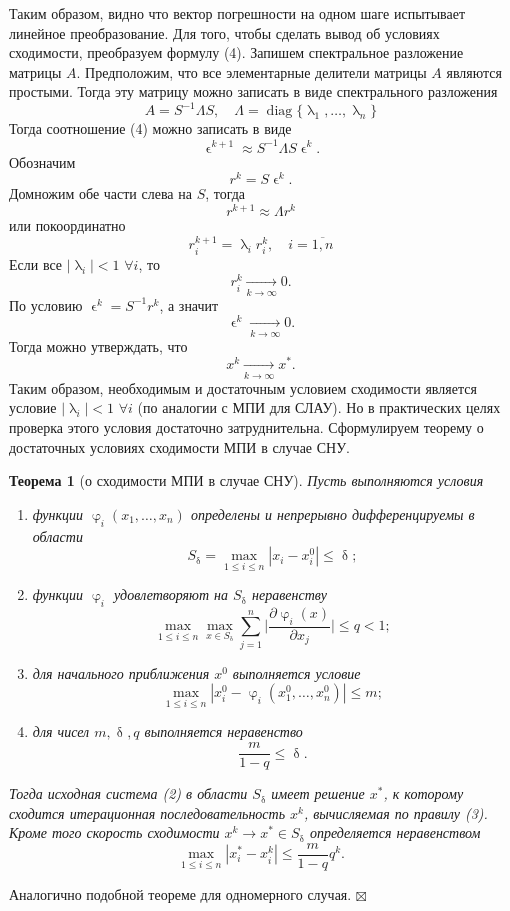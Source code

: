 \documentclass[a4paper, 12pt]{report}
\newenvironment{Proof} %
{\par\noindent{$\blacklozenge$}} %
{\hfill$\scriptstyle\boxtimes$}
\renewcommand{\leq}{\leqslant}
\renewcommand{\delta}{\updelta}
\renewcommand{\varphi}{\upvarphi}
\renewcommand{\lambda}{\uplambda}
\renewcommand{\epsilon}{\upvarepsilon}
\newtheorem*{theorem}{Теорема}
\begin{document}
Таким образом, видно что вектор погрешности на одном шаге испытывает линейное преобразование. Для того, чтобы сделать вывод об условиях сходимости, преобразуем формулу (4). Запишем спектральное разложение матрицы $A$. Предположим, что все элементарные делители матрицы $A$ являются простыми. Тогда эту матрицу можно записать в виде спектрального разложения $$A = S^{-1}\Lambda S,\quad \Lambda = \operatorname{diag}\{\lambda_1,\ldots, \lambda_n\}$$
Тогда соотношение (4) можно записать в виде $$\epsilon^{k+1} \approx S^{-1}\Lambda S \epsilon^k.$$
Обозначим $$r^k = S \epsilon^k.$$
Домножим обе части слева на $S$, тогда $$r^{k+1}\approx \Lambda r^k$$
или покоординатно $$r_i^{k+1} = \lambda_i r^k_i,\quad i=\overline{1,n}$$
Если все $|\lambda_i| <1$ $\forall i$, то $$r_i^k\xrightarrow[k\to \infty]{}0.$$ По условию $\epsilon^k = S^{-1}r^{k}$, а значит $$\epsilon^k\xrightarrow[k\to \infty]{}0.$$
Тогда можно утверждать, что $$x^k\xrightarrow[k\to\infty]{} x^*.$$
Таким образом, необходимым и достаточным условием сходимости является условие $|\lambda_i| <1$ $\forall i$ (по аналогии с МПИ для СЛАУ). Но в практических целях проверка этого условия достаточно затруднительна. Сформулируем теорему о достаточных условиях сходимости МПИ в случае СНУ.
\begin{theorem}
	[о сходимости МПИ в случае СНУ]
	Пусть выполняются условия\begin{enumerate}
		\item функции $\varphi_i(x_1,\ldots, x_n)$ определены и непрерывно дифференцируемы в области $$S_\delta = \max_{1\leq i \leq n}|x_i - x^0_i|\leq \delta;$$
		\item функции $\varphi_i$ удовлетворяют на $S_\delta$ неравенству
		$$\max_{1\leq i \leq n} \max_{x \in S_\delta} \sum_{j=1}^{n}\Big|\dfrac{\partial \varphi_i(x)}{\partial x_j}\Big|\leq q < 1;$$
		\item для начального приближения $x^0$ выполняется условие $$\max_{1\leq i \leq n}|x_i^0 - \varphi_i(x_1^0,\ldots, x_n^0)| \leq m;$$
		\item для чисел $m,\delta, q$ выполняется неравенство $$\dfrac{m}{1-q}\leq \delta.$$
	\end{enumerate}
	Тогда исходная система (2) в области $S_\delta$ имеет решение $x^*$, к которому сходится итерационная последовательность $x^k$, вычисляемая по правилу (3). Кроме того скорость сходимости $x^k \to x^* \in S_\delta$ определяется неравенством $$\max_{1\leq i \leq n}|x_i^* -x_i^k|\leq \dfrac{m}{1-q}q^k.$$
\end{theorem}
\begin{Proof}
	Аналогично подобной теореме для одномерного случая.
\end{Proof}
\end{document}
